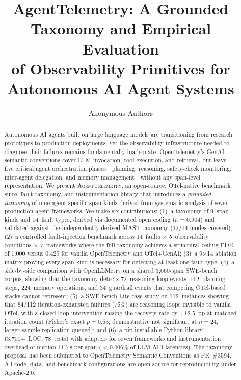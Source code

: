 \documentclass{article}
\title{AgentTelemetry: A Grounded Taxonomy and Empirical Evaluation\\of Observability Primitives for Autonomous AI Agent Systems}
\author{Anonymous Authors}
\begin{document}
\maketitle

\begin{abstract}
Autonomous AI agents built on large language models are transitioning
from research prototypes to production deployments, yet the
observability infrastructure needed to diagnose their failures remains
fundamentally inadequate.  OpenTelemetry's GenAI semantic conventions
cover LLM invocation, tool execution, and retrieval, but leave five
critical agent orchestration phases---planning, reasoning, safety-check
monitoring, inter-agent delegation, and memory management---without
any span-level representation.
We present \textsc{AgentTelemetry}, an open-source, OTel-native
benchmark suite, fault taxonomy, and instrumentation library that
introduces a \emph{grounded taxonomy} of nine agent-specific span kinds
derived from systematic analysis of seven production agent frameworks.
We make six contributions:
(1)~a taxonomy of 9~span kinds and 14~fault types, derived via
documented open coding ($\kappa{=}0.904$) and validated against the
independently-derived MAST taxonomy (12/14 modes covered);
(2)~a controlled fault-injection benchmark across 14~faults
$\times$ 5~observability conditions $\times$ 7~frameworks
where the full taxonomy achieves a structural-ceiling FDR of $1.000$
versus $0.429$ for vanilla OpenTelemetry and OTel+GenAI;
(3)~a 9$\times$14 ablation matrix proving every span kind is necessary
for detecting at least one fault type;
(4)~a side-by-side comparison with OpenLLMetry on a shared 3{,}060-span
SWE-bench corpus, showing that the taxonomy detects 72~reasoning-loop
events, 112~planning steps, 224~memory operations, and 34~guardrail
events that competing OTel-based stacks cannot represent;
(5)~a SWE-bench Lite case study on 112~instances showing that 84/112
iteration-exhausted failures (75\%) are reasoning loops invisible to
vanilla OTel, with a closed-loop intervention raising the recovery rate
by $+12.5$~pp at matched iteration count (Fisher's exact $p{=}0.53$;
demonstrative not significant at $n{=}24$, larger-sample replication
queued); and
(6)~a pip-installable Python library (3{,}700+~LOC, 78~tests) with
adapters for seven frameworks and instrumentation overhead of
median $11.7$\,\textmu s per span ($<$0.006\% of LLM API latencies).
The taxonomy proposal has been submitted to OpenTelemetry Semantic
Conventions as PR~\#3594.
All code, data, and benchmark configurations are open-source for
reproducibility under Apache-2.0.
\end{abstract}
\end{document}
